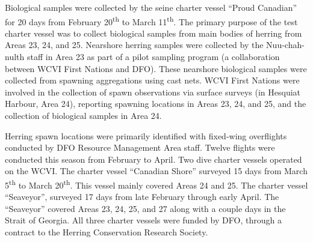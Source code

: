 Biological samples were collected by the seine charter vessel ``Proud Canadian'' for 20 days from February 20\textsuperscript{th} to March 11\textsuperscript{th}.
The primary purpose of the test charter vessel was to collect biological samples from main bodies of herring from Areas 23, 24, and 25.
Nearshore herring samples were collected by the Nuu-chah-nulth staff in Area 23 as part of a pilot sampling program (a collaboration between WCVI First Nations and DFO). 
These nearshore biological samples were collected from spawning aggregations using cast nets.
WCVI First Nations were involved in the collection of spawn observations via surface surveys (in Hesquiat Harbour, Area 24), reporting spawning locations in Areas 23, 24, and 25, and the collection of biological samples in Area 24.

Herring spawn locations were primarily identified with fixed-wing overflights conducted by DFO Resource Management Area staff.
Twelve flights were conducted this season from February to April.
Two dive charter vessels operated on the WCVI.
The charter vessel ``Canadian Shore'' surveyed 15 days from March 5\textsuperscript{th} to March 20\textsuperscript{th}.
This vessel mainly covered Areas 24 and 25.
The charter vessel ``Seaveyor'', surveyed 17 days from late February through early April.
The ``Seaveyor'' covered Areas 23, 24, 25, and 27 along with a couple days in the Strait of Georgia.
All three charter vessels were funded by DFO, through a contract to the Herring Conservation Research Society.